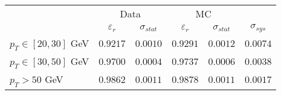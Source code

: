 \begin{tabular}{|l||c|c||c|c||c|}
\hline
&\multicolumn{2}{c||}{Data}&\multicolumn{2}{c||}{MC}&\multicolumn{1}{c|}{}\\ & $\varepsilon_r$ & $\sigma_{stat}$ & $\varepsilon_r$ & $\sigma_{stat}$ & $\sigma_{sys}$\\ 
\hline\hline
$p_{T}\in[20,30]$ GeV &  $0.9217$ &  $0.0010$ &  $0.9291$ &  $0.0012$ &  $0.0074$\\ 
$p_{T}\in[30,50]$ GeV &  $0.9700$ &  $0.0004$ &  $0.9737$ &  $0.0006$ &  $0.0038$\\ 
$p_{T} > 50$ GeV &  $0.9862$ &  $0.0011$ &  $0.9878$ &  $0.0011$ &  $0.0017$\\ 
\hline
\end{tabular}
